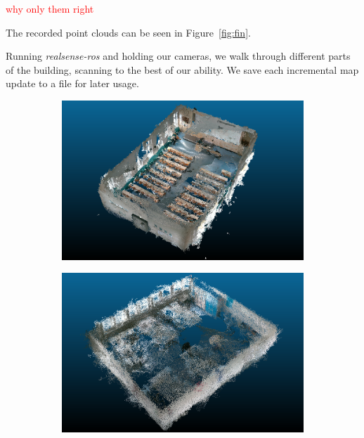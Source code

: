 \documentclass[main.tex]{subfiles}
\begin{document}
\textcolor{red}{why only them right}

The recorded point clouds can be seen in Figure~\ref{fig:fin}.


Running \textit{realsense-ros} and holding our cameras, we walk through different parts of the building, scanning to the best of our ability.
We save each incremental map update to a file for later usage.

\begin{figure}[H]
    \begin{subfigure}{0.5\textwidth}
        \centering
        \includegraphics[width=.9\linewidth]{images/307.png}
        \caption[Dynamic Dataset - auditorium]{}
        \label{fig:fin307}
    \end{subfigure}
    \begin{subfigure}{0.5\textwidth}
        \centering
        \includegraphics[width=.9\linewidth]{images/333.png}
        \caption[Dynamic Dataset - conference room]{}
        \label{fig:fin333}
    \end{subfigure}
    \begin{subfigure}{0.5\textwidth}

\end{subfigure}
\end{figure}
\end{document}
